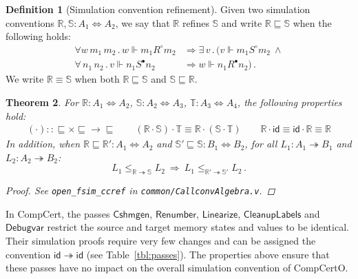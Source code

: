 \documentclass[11pt,oneside,draft]{book}
\newtheorem{theorem}{Theorem}[chapter]
\theoremstyle{definition}
\newtheorem{definition}[theorem]{Definition}
\newcommand{\kw}[1]{\ensuremath{ \mathsf{#1} }}
\newcommand{\que}{\circ}         %
\newcommand{\ans}{\bullet}       %
\newcommand{\scref}{\sqsubseteq} %
\begin{document}
\begin{definition}[Simulation convention refinement] %
Given two simulation conventions
$\mathbb{R}, \mathbb{S} : A_1 \Leftrightarrow A_2$,
we say that
$\mathbb{R}$ refines $\mathbb{S}$ and write
$\mathbb{R} \scref \mathbb{S}$
when the following holds:
\begin{align*}
  \forall w \, m_1 \, m_2 \,.\,
  w \Vdash m_1 \mathrel{R^\que} m_2 &\Rightarrow
  \exists \, v \,.\, (
  v \Vdash m_1 \mathrel{S^\que} m_2
  \: \wedge \\
  \forall \, n_1 \, n_2 \,.\,
  v \Vdash n_1 \mathrel{S^\ans} n_2 &\Rightarrow
  w \Vdash n_1 \mathrel{R^\ans} n_2) \,.
\end{align*}
We write $\mathbb{R} \equiv \mathbb{S}$ when both
$\mathbb{R} \scref \mathbb{S}$ and
$\mathbb{S} \scref \mathbb{R}$.
\end{definition}

\begin{theorem} %
For
$\mathbb{R} : A_1 \Leftrightarrow A_2$,
$\mathbb{S} : A_2 \Leftrightarrow A_3$,
$\mathbb{T} : A_3 \Leftrightarrow A_4$,
the following properties hold:
\begin{gather*}
  ({\cdot}) :: {{\scref} \times {\scref} \rightarrow {\scref}}
  \qquad
  (\mathbb{R} \cdot \mathbb{S}) \cdot \mathbb{T} \equiv
    \mathbb{R} \cdot (\mathbb{S} \cdot \mathbb{T})
  \qquad
  \mathbb{R} \cdot \kw{id} \equiv
  \kw{id} \cdot \mathbb{R} \equiv
  \mathbb{R}
\end{gather*}
In addition, when
$\mathbb{R} \scref \mathbb{R}' : A_1 \Leftrightarrow A_2$ and
$\mathbb{S}' \scref \mathbb{S} : B_1 \Leftrightarrow B_2$,
for all
$L_1 : A_1 \twoheadrightarrow B_1$ and $L_2 : A_2 \twoheadrightarrow B_2$:
\[
      L_1 \le_{\mathbb{R} \twoheadrightarrow \mathbb{S}} L_2
      \: \Rightarrow \:
      L_1 \le_{\mathbb{R}' \twoheadrightarrow \mathbb{S}'} L_2 \,.
\]
\begin{proof}
See \texttt{open\_fsim\_ccref} in \texttt{common/CallconvAlgebra.v}.
\end{proof}
\end{theorem}

In CompCert,
the passes \kw{Cshmgen}, \kw{Renumber}, \kw{Linearize},
\kw{CleanupLabels} and \kw{Debugvar}
restrict the source and target
memory states and values to be identical.
Their simulation proofs require very few changes
and can be assigned the convention $\kw{id} \twoheadrightarrow \kw{id}$
(see Table~\ref{tbl:passes}).
The properties above ensure that these passes
have no impact on the overall simulation convention
of CompCertO.
\end{document}

